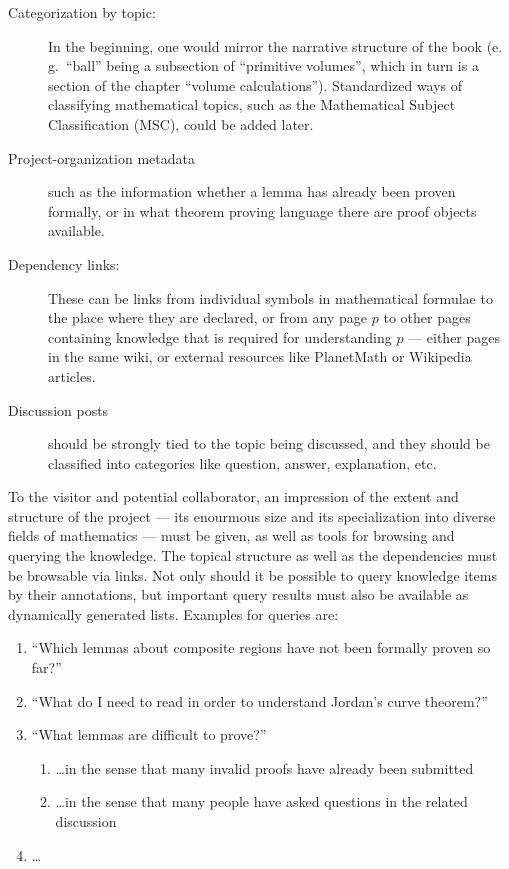 \begin{description}
\item[Categorization by topic:] In the beginning, one would mirror the narrative structure
  of the book (e.\,g.\ ``ball'' being a subsection of ``primitive volumes'', which in turn
  is a section of the chapter ``volume calculations'').  Standardized ways of classifying
  mathematical topics, such as the Mathematical Subject Classification
  (MSC)\cite{AMS:MSC2000}, could be added later.
\item[Project-organization metadata] such as the information whether a lemma has already
  been proven formally, or in what theorem proving language there are proof objects
  available.
\item[Dependency links:] These can be links from individual symbols in mathematical
  formulae to the place where they are declared, or from any page $p$ to other pages
  containing knowledge that is required for understanding $p$ --- either pages in the same
  wiki, or external resources like PlanetMath or Wikipedia articles.
\item[Discussion posts] should be strongly tied to the topic being discussed, and they
  should be classified into categories like question, answer, explanation,
  etc.
\end{description}

To the visitor and potential collaborator, an impression of the extent and structure of
the project --- its enourmous size and its specialization into diverse fields of
mathematics --- must be given, as well as tools for browsing and querying the knowledge.
The topical structure as well as the dependencies must be browsable via links.  Not only
should it be possible to query knowledge items by their annotations, but important query
results must also be available as dynamically generated lists.  Examples for queries are:

\begin{enumerate}
\item\label{item:proven-lemma} ``Which lemmas about composite regions have not been
  formally proven so far?''
\item ``What do I need to read in order to understand Jordan's curve
  theorem?''
\item ``What lemmas are difficult to prove?''
  \begin{enumerate}
  \item \ldots in the sense that many invalid proofs have already been submitted
  \item\label{item:question-count} \ldots in the sense that many people have asked
    questions in the related discussion
  \end{enumerate}
\item \ldots{}
\end{enumerate}

